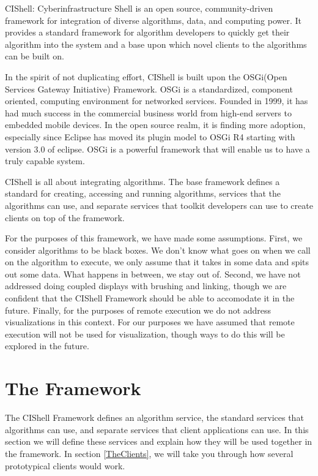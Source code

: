 \documentclass[a4]{article}
\begin{document}
CIShell: Cyberinfrastructure Shell is an open source, community-driven 
framework for integration of diverse algorithms, data, and computing power. It 
provides a standard framework for algorithm developers to quickly get their 
algorithm into the system and a base upon which novel clients to the algorithms 
can be built on.


In the spirit of not duplicating effort, CIShell is built upon the 
OSGi\footnotemark[1] (Open Services Gateway Initiative) Framework. OSGi is a 
standardized, component oriented, computing environment for networked services.
Founded in 1999, it has had much success in the commercial business world from
high-end servers to embedded mobile devices. In the open source realm, it is
finding more adoption, especially since Eclipse has moved its plugin model to
OSGi R4 starting with version 3.0 of eclipse. OSGi is a powerful framework that
will enable us to have a truly capable system.

CIShell is all about integrating algorithms. The base framework defines a 
standard for creating, accessing and running algorithms, services that the 
algorithms can use, and separate services that toolkit developers can use to 
create clients on top of the framework.

For the purposes of this framework, we have made some assumptions. First, we
consider algorithms to be black boxes. We don't know what goes on when we call
on the algorithm to execute, we only assume that it takes in some data and
spits out some data. What happens in between, we stay out of. Second, we have
not addressed doing coupled displays with brushing and linking, though we are
confident that the CIShell Framework should be able to accomodate it in the
future. Finally, for the purposes of remote execution we do not address
visualizations in this context. For our purposes we have assumed that remote
execution will not be used for visualization, though ways to do this will be
explored in the future.

\section{The Framework}
\label{TheFramework}

The CIShell Framework defines an algorithm service, the standard services that 
algorithms can use, and separate services that client applications can use. In 
this section we will define these services and explain how they will be used 
together in the framework. In section \ref{TheClients}, we will take you 
through how several prototypical clients would work.
\end{document}
